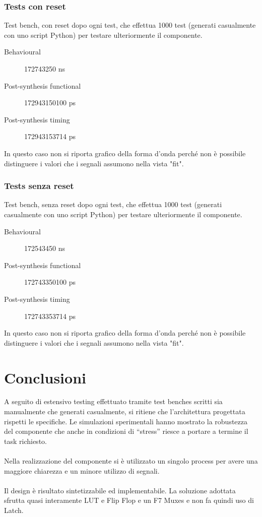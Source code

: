 \documentclass{article}
\begin{document}
\subsubsection{Tests con reset}
Test bench, con reset dopo ogni test, che effettua 1000 test (generati casualmente con uno script Python) per testare ulteriormente il componente.
\begin{description}
	\item[Behavioural] 172743250 ns
	\item[Post-synthesis functional] 172943150100 ps
	\item[Post-synthesis timing] 172943153714 ps
\end{description}
In questo caso non si riporta grafico della forma d'onda perché non è possibile distinguere i valori che i segnali assumono nella vista "fit".

\subsubsection{Tests senza reset}
Test bench, senza reset dopo ogni test, che effettua 1000 test (generati casualmente con uno script Python) per testare ulteriormente il componente.
\begin{description}
	\item[Behavioural] 172543450 ns
	\item[Post-synthesis functional] 172743350100 ps
	\item[Post-synthesis timing] 172743353714 ps
\end{description}
In questo caso non si riporta grafico della forma d'onda perché non è possibile distinguere i valori che i segnali assumono nella vista "fit".
\pagebreak

\section{Conclusioni}
A seguito di estensivo testing effettuato tramite test benches scritti sia manualmente che generati casualmente, si ritiene che l’architettura progettata rispetti le specifiche. Le simulazioni sperimentali hanno mostrato la robustezza del componente che anche in condizioni di “stress” riesce a portare a termine il task richiesto.
\\
\\
Nella realizzazione del componente si è utilizzato un singolo process per avere una maggiore chiarezza e un minore utilizzo di segnali.
\\
\\
Il design è risultato sintetizzabile ed implementabile. La soluzione adottata sfrutta quasi interamente LUT e Flip Flop e un F7 Muxes e non fa quindi uso di Latch.
\\

\end{document}
